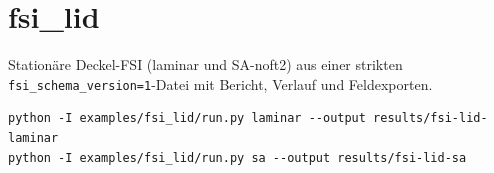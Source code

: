\section{fsi\_lid}
\label{recipe:fsi-lid}
Stationäre Deckel-FSI (laminar und SA-noft2) aus einer strikten
\texttt{fsi\_schema\_version=1}-Datei mit Bericht, Verlauf und Feldexporten.
\begin{lstlisting}
python -I examples/fsi_lid/run.py laminar --output results/fsi-lid-laminar
python -I examples/fsi_lid/run.py sa --output results/fsi-lid-sa
\end{lstlisting}

